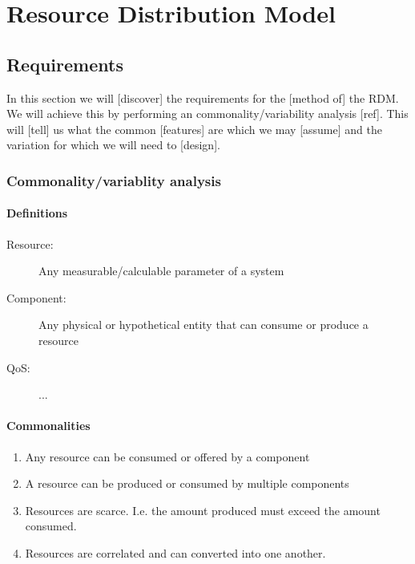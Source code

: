 \newcommand{\rumid}{1}
\chapter{Resource Distribution Model}
\section{Requirements}
In this section we will [discover] the requirements for the [method of] the RDM. We will achieve this by performing an commonality/variability analysis [ref]. This will [tell] us what the common [features] are which we may [assume] and the variation for which we will need to [design].
\subsection{Commonality/variablity analysis}
\subsubsection{Definitions}
\begin{description}
\item[Resource:] Any measurable/calculable parameter of a system
\item[Component:] Any physical or hypothetical entity that can consume or produce a resource
\item[QoS:] ...
\end{description}
\subsubsection{Commonalities}
\begin{enumerate}[label=C\rumid .\arabic*]
\item Any resource can be consumed or offered by a component
\item A resource can be produced or consumed by multiple components
\item Resources are scarce. I.e. the amount produced must exceed the amount consumed.
\item \label{c:res_transf} Resources are correlated and can converted into one another.
\end{enumerate}

